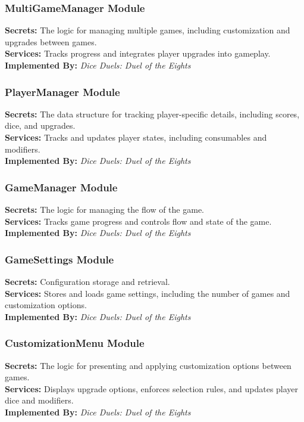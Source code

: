 \documentclass[12pt, titlepage]{article}
\begin{document}
\subsubsection{MultiGameManager Module}
\textbf{Secrets:} The logic for managing multiple games, including customization and upgrades between games.\\
\textbf{Services:} Tracks progress and integrates player upgrades into gameplay.\\
\textbf{Implemented By:} \textit{Dice Duels: Duel of the Eights}

\subsubsection{PlayerManager Module}
\textbf{Secrets:} The data structure for tracking player-specific details, including scores, dice, and upgrades.\\
\textbf{Services:} Tracks and updates player states, including consumables and modifiers.\\
\textbf{Implemented By:} \textit{Dice Duels: Duel of the Eights}

\subsubsection{GameManager Module}
\textbf{Secrets:} The logic for managing the flow of the game.\\
\textbf{Services:} Tracks game progress and controls flow and state of the game.\\
\textbf{Implemented By:} \textit{Dice Duels: Duel of the Eights}

\subsubsection{GameSettings Module}
\textbf{Secrets:} Configuration storage and retrieval.\\
\textbf{Services:} Stores and loads game settings, including the number of games and customization options.\\
\textbf{Implemented By:} \textit{Dice Duels: Duel of the Eights}

\subsubsection{CustomizationMenu Module}
\textbf{Secrets:} The logic for presenting and applying customization options between games.\\
\textbf{Services:} Displays upgrade options, enforces selection rules, and updates player dice and modifiers.\\
\textbf{Implemented By:} \textit{Dice Duels: Duel of the Eights}
\end{document}
